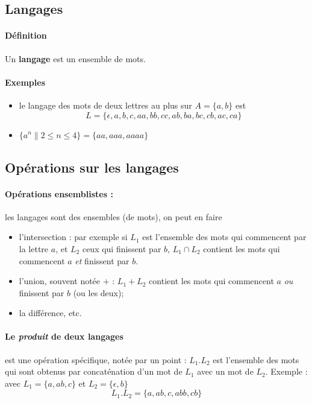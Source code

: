 \documentclass[10pt,twoside]{article}
\begin{document}
\subsection{Langages}

\paragraph{Définition} Un \textbf{langage} est un ensemble de mots.

\paragraph{Exemples} 
\begin{itemize} 
\item le langage des mots de deux lettres au plus sur $A = \{a, b\}$
  est $$L = \{ \epsilon, a, b, c, aa, bb, cc, ab, ba, bc, cb, ac, ca
  \}$$
\item $ \{ a^n \| 2 \leq n\leq 4\} = \{ aa, aaa, aaaa \}$
\end{itemize}

\subsection{Opérations sur les langages}

\paragraph{Opérations ensemblistes : } les langages sont
 des ensembles (de mots), on peut en faire
\begin{itemize}
\item l'intersection : par exemple si $L_1$ est l'ensemble des mots
  qui commencent par la lettre $a$, et $L_2$ ceux qui finissent par
  $b$, $L_1 \cap L_2$ contient les mots qui commencent $a$ \emph{et}
  finissent par $b$.
\item l'union, souvent notée $+$ : $L_1 + L_2$ contient les mots qui
  commencent $a$ \emph{ou} finissent par $b$ (ou les deux);
\item la différence, etc.
\end{itemize}

\paragraph{Le \emph{produit} de deux langages} est une opération 
spécifique, notée par un point : $L_1 . L_2$ est l'ensemble des mots
qui sont obtenus par concaténation d'un mot de $L_1$ avec un mot de
$L_2$.  Exemple : avec $L_1 = \{a, ab, c \}$ et $L_2 = \{ \epsilon, b
\}$
$$L_1.L_2 = \{ a, ab, c, abb, cb \}$$
\end{document}
